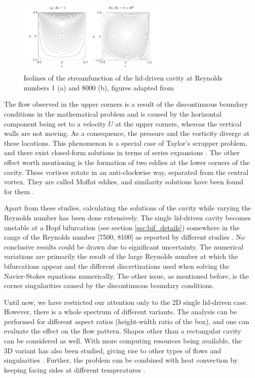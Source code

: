 \begin{figure}[ht!]
\begin{center}
  \includegraphics[width=0.65\textwidth]{figs/fig_kuhlmann2019}
\end{center}
\caption{Isolines of the streamfunction of the lid-driven cavity at Reynolds
  numbers 1 (a) and 8000 (b), figures adapted from \cite{kuhlmann2019}}
\label{fig:Re_cav_simple}
\end{figure}

The flow observed in the upper corners is a result of the discontinuous
boundary conditions in the mathematical problem and is caused by the horizontal
component being set to a velocity $U$ at the upper corners, whereas the
vertical walls are not moving. As a consequence, the pressure and the vorticity
diverge at these locations. This phenomenon is a special case of Taylor's
scrapper problem, and there exist closed-form solutions in terms of series
expansions \citep{kuhlmann2019}. The other effect worth mentioning is the
formation of two eddies at the lower corners of the cavity. These vortices
rotate in an anti-clockwise way, separated from the central vortex. They are
called Moffat eddies, and similarity solutions have been found for them
\citep{moffatt1964}.

Apart from these studies, calculating the solutions of the cavity while varying
the Reynolds number has been done extensively. The single lid-driven cavity
becomes unstable at a Hopf bifurcation (see section \ref{sec:bif_details})
somewhere in the range of the Reynolds number [7500, 8100] as reported by
different studies \citep{kuhlmann2019}. No conclusive results could be drawn
due to significant uncertainty. The numerical variations are primarily the
result of the large Reynolds number at which the bifurcations appear and the
different discretizations used when solving the Navier-Stokes equations
numerically. The other issue, as mentioned before, is the corner singularities
caused by the discontinuous boundary conditions.

Until now, we have restricted our attention only to the 2D single lid-driven
case. However, there is a whole spectrum of different variants. The analysis
can be performed for different aspect ratios (height-width ratio of the box),
and one can evaluate the effect on the flow pattern. Shapes other than a
rectangular cavity can be considered as well. With more computing resources
being available, the 3D variant has also been studied, giving rise to other
types of flows and singularities \citep{lopez2017}. Further, the problem can be
combined with heat convection by keeping facing sides at different temperatures
\citep{koseff1985}. \\

